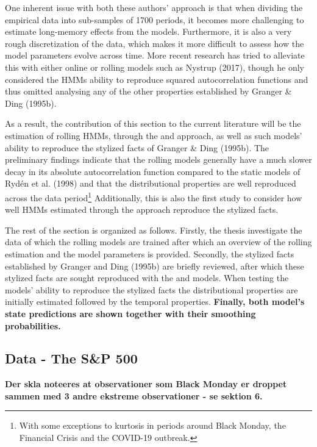One inherent issue with both these authors' approach is that when dividing the empirical data into sub-samples of 1700 periods, it becomes more challenging to estimate long-memory effects from the models. Furthermore, it is also a very rough discretization of the data, which makes it more difficult to assess how the model parameters evolve across time. More recent research has tried to alleviate this with either online or rolling models such as Nystrup (2017), though he only considered the HMMs ability to reproduce squared autocorrelation functions and thus omitted analysing any of the other properties established by Granger \& Ding (1995b).

As a result, the contribution of this section to the current literature will be the estimation of rolling HMMs, through the \mle and \jump approach, as well as such models' ability to reproduce the stylized facts of Granger \& Ding (1995b). The preliminary findings indicate that the rolling models generally have a much slower decay in its absolute autocorrelation function compared to the static models of Rydén et al. (1998) and that the distributional properties are well reproduced across the data period\footnote{
With some exceptions to kurtosis in periods around Black Monday, the Financial Crisis and the COVID-19 outbreak.
}
Additionally, this is also the first study to consider how well HMMs estimated through the \jump approach reproduce the stylized facts.

The rest of the section is organized as follows. Firstly, the thesis investigate the data of which the rolling models are trained after which an overview of the rolling estimation and the model parameters is provided. Secondly, the stylized facts established by Granger and Ding (1995b) are briefly reviewed, after which these stylized facts are sought reproduced with the \mle and \jump models. When testing the models' ability to reproduce the stylized facts the distributional properties are initially estimated followed by the temporal properties. \textbf{Finally, both model's state predictions are shown together with their smoothing probabilities.}


\subsection{Data - The S\&P 500}

\textbf{Der skla noteeres at observationer som Black Monday er droppet sammen med 3 andre ekstreme observationer - se sektion 6.}

